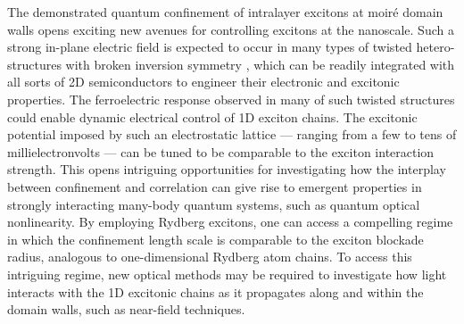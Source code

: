 The demonstrated quantum confinement of intralayer excitons at moiré domain walls opens exciting new avenues for controlling excitons at the nanoscale. 
Such a strong in-plane electric field is expected to occur in many types of twisted hetero-structures with broken inversion symmetry \cite{Sung2020-ru}, which can be readily integrated with all sorts of 2D semiconductors to engineer their electronic and excitonic properties\cite{Akamatsu2021-uo,Hu2023-px,He2024-se,Zhang2024-zi}. 
The ferroelectric response observed in many of such twisted structures could enable dynamic electrical control of 1D exciton chains\cite{Kim2025-jv,Vizner-Stern2021-gx,Yasuda2024-qd}. 
The excitonic potential imposed by such an electrostatic lattice — ranging from a few to tens of millielectronvolts — can be tuned to be comparable to the exciton interaction strength\cite{Gu2024-en,Datta2022-po,Tagarelli2023-an,Gu2021-cu,Wang2018-pz}. 
This opens intriguing opportunities for investigating how the interplay between confinement and correlation can give rise to emergent properties in strongly interacting many-body quantum systems, such as quantum optical nonlinearity. 
By employing Rydberg excitons, one can access a compelling regime in which the confinement length scale is comparable to the exciton blockade radius, analogous to one-dimensional Rydberg atom chains\cite{Endres2016-zd,Firstenberg2013-to,Roy2017-nd}. 
To access this intriguing regime, new optical methods may be required to investigate how light interacts with the 1D excitonic chains as it propagates along and within the domain walls, such as near-field techniques\cite{Zhang2022-ty,Crottini2001-lg}.